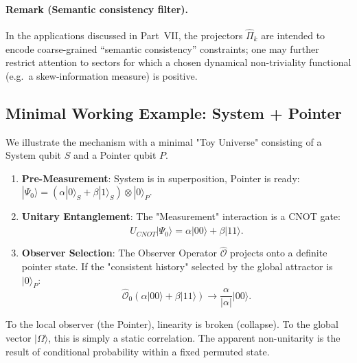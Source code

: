 \paragraph{Remark (Semantic consistency filter).}
In the applications discussed in Part~VII, the projectors $\hat{\Pi}_k$ are intended to encode coarse-grained ``semantic consistency'' constraints; one may further restrict attention to sectors for which a chosen dynamical non-triviality functional (e.g.\ a skew-information measure) is positive.

\subsection{Minimal Working Example: System + Pointer}
We illustrate the mechanism with a minimal "Toy Universe" consisting of a System qubit $S$ and a Pointer qubit $P$.
\begin{enumerate}
    \item \textbf{Pre-Measurement}: System is in superposition, Pointer is ready: $|\Psi_0\rangle = (\alpha|0\rangle_S + \beta|1\rangle_S) \otimes |0\rangle_P$.
    \item \textbf{Unitary Entanglement}: The "Measurement" interaction is a CNOT gate:
    \begin{equation}
        \hat{U}_{CNOT} |\Psi_0\rangle = \alpha |00\rangle + \beta |11\rangle.
    \end{equation}
    \item \textbf{Observer Selection}: The Observer Operator $\hat{\mathcal{O}}$ projects onto a definite pointer state. If the "consistent history" selected by the global attractor is $|0\rangle_P$:
    \begin{equation}
        \hat{\mathcal{O}}_0 (\alpha |00\rangle + \beta |11\rangle) \to \frac{\alpha}{|\alpha|} |00\rangle.
    \end{equation}
\end{enumerate}
To the local observer (the Pointer), linearity is broken (collapse). To the global vector $|\Omega\rangle$, this is simply a static correlation. The apparent non-unitarity is the result of conditional probability within a fixed permuted state.

